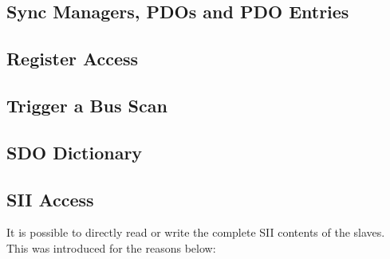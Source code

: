 \documentclass[a4paper,12pt,BCOR=6mm,bibtotoc,idxtotoc]{scrbook}
\begin{document}



\subsection{Sync Managers, PDOs and PDO Entries}




\subsection{Register Access}
\label{sec:regaccess}






\subsection{Trigger a Bus Scan}
\label{sec:rescan}




\subsection{SDO Dictionary}




\subsection{SII Access}
\label{sec:siiaccess}

It is possible to directly read or write the complete SII contents of the
slaves. This was introduced for the reasons below:
\end{document}
